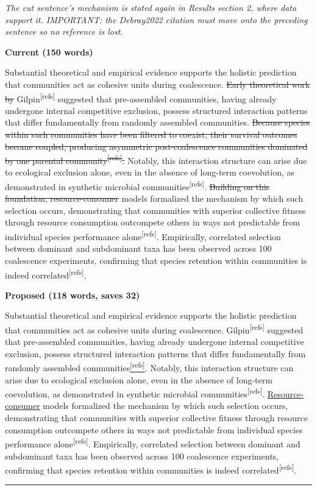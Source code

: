 \documentclass[11pt,a4paper]{article}
\newcommand{\citep}[1]{\textsuperscript{[refs]}}
\newcommand{\cutx}[1]{{\color{CutRed}\sout{#1}}}
\newcommand{\newx}[1]{{\color{CutRed}\uline{#1}}}
\newcommand{\rationale}[1]{{\color{GrayNote}\small\textit{#1}}\par\smallskip}
\newcommand{\panel}[1]{\par\smallskip\noindent\textbf{\small #1}\par}
\newcommand{\decision}{\par\smallskip\noindent{\color{GrayNote}\small$\square$~accept\quad$\square$~reject\quad$\square$~modify}\par
\noindent\rule{\linewidth}{0.4pt}}
\begin{document}
\rationale{The cut sentence's mechanism is stated again in Results section 2, where data support it. IMPORTANT: the Debray2022 citation must move onto the preceding sentence so no reference is lost.}
\panel{Current (150 words)}
Substantial theoretical and empirical evidence supports the holistic prediction that communities act as cohesive units during coalescence. \cutx{Early theoretical work by }Gilpin\citep{Gilpin1994} suggested that pre-assembled communities, having already undergone internal competitive exclusion, possess structured interaction patterns that differ fundamentally from randomly assembled communities. \cutx{Because species within such communities have been filtered to coexist, their survival outcomes become coupled, producing asymmetric post-coalescence communities dominated by one parental community\citep{Debray2022}. }Notably, this interaction structure can arise due to ecological exclusion alone, even in the absence of long-term coevolution, as demonstrated in synthetic microbial communities\citep{Venturelli2018, Maynard2020}. \cutx{Building on this foundation, resource-consumer} models formalized the mechanism by which such selection occurs, demonstrating that communities with superior collective fitness through resource consumption outcompete others in ways not predictable from individual species performance alone\citep{Tikhonov2016, Lechon2021, Xie2019, Xie2021}. Empirically, correlated selection between dominant and subdominant taxa has been observed across 100 coalescence experiments, confirming that species retention within communities is indeed correlated\citep{DiazColunga2022}.
\panel{Proposed (118 words, saves 32)}
Substantial theoretical and empirical evidence supports the holistic prediction that communities act as cohesive units during coalescence. \newx{}Gilpin\citep{Gilpin1994} suggested that pre-assembled communities, having already undergone internal competitive exclusion, possess structured interaction patterns that differ fundamentally from randomly assembled communities\newx{\citep{Debray2022}}. Notably, this interaction structure can arise due to ecological exclusion alone, even in the absence of long-term coevolution, as demonstrated in synthetic microbial communities\citep{Venturelli2018, Maynard2020}. \newx{Resource-consumer} models formalized the mechanism by which such selection occurs, demonstrating that communities with superior collective fitness through resource consumption outcompete others in ways not predictable from individual species performance alone\citep{Tikhonov2016, Lechon2021, Xie2019, Xie2021}. Empirically, correlated selection between dominant and subdominant taxa has been observed across 100 coalescence experiments, confirming that species retention within communities is indeed correlated\citep{DiazColunga2022}.
\decision
\end{document}
